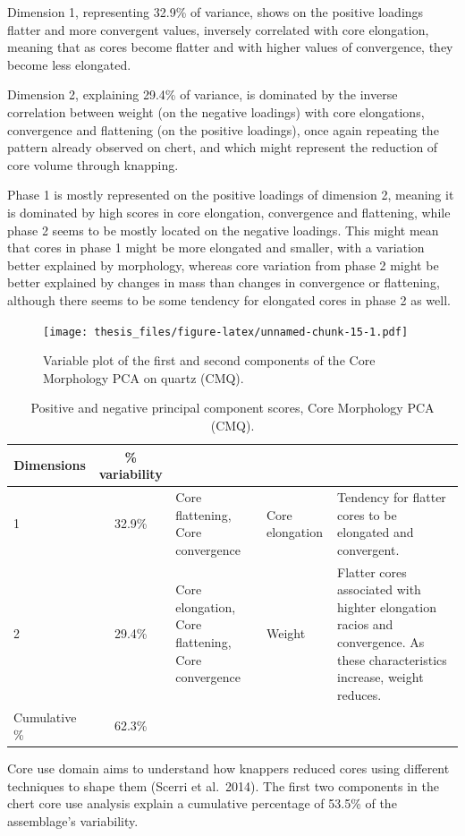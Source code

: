 \documentclass[12pt,twoside]{reedthesis}
\begin{document}
Dimension 1, representing 32.9\% of variance, shows on the positive loadings flatter and more convergent values, inversely correlated with core elongation, meaning that as cores become flatter and with higher values of convergence, they become less elongated.

Dimension 2, explaining 29.4\% of variance, is dominated by the inverse correlation between weight (on the negative loadings) with core elongations, convergence and flattening (on the positive loadings), once again repeating the pattern already observed on chert, and which might represent the reduction of core volume through knapping.

Phase 1 is mostly represented on the positive loadings of dimension 2, meaning it is dominated by high scores in core elongation, convergence and flattening, while phase 2 seems to be mostly located on the negative loadings. This might mean that cores in phase 1 might be more elongated and smaller, with a variation better explained by morphology, whereas core variation from phase 2 might be better explained by changes in mass than changes in convergence or flattening, although there seems to be some tendency for elongated cores in phase 2 as well.
\begin{figure}
\centering
\texttt{[image: thesis\_files/figure-latex/unnamed-chunk-15-1.pdf]}
\caption{\label{fig:unnamed-chunk-15}Variable plot of the first and second components of the Core Morphology PCA on quartz (CMQ).}
\end{figure}
\begin{table}[!h]

\caption{\label{tab:unnamed-chunk-16}Positive and negative principal component scores, Core Morphology PCA (CMQ).}
\centering
\begin{tabular}[t]{lc>{\raggedright\arraybackslash}p{3cm}>{\raggedright\arraybackslash}p{3cm}>{\raggedright\arraybackslash}p{3cm}}
\toprule
\multicolumn{1}{c}{\textbf{Dimensions}} & \multicolumn{1}{c}{\textbf{\% variability}} & \multicolumn{1}{>{\centering\arraybackslash}p{3cm}}{\textbf{+}} & \multicolumn{1}{>{\centering\arraybackslash}p{3cm}}{\textbf{-}} & \multicolumn{1}{>{\centering\arraybackslash}p{3cm}}{\textbf{Interpretation}}\\
\midrule
1 & 32.9\% & Core flattening, Core convergence & Core elongation & Tendency for flatter cores to be elongated and convergent.\\
2 & 29.4\% & Core elongation, Core flattening, Core convergence & Weight & Flatter cores associated with highter elongation racios and convergence. As these characteristics increase, weight reduces.\\
Cumulative \% & 62.3\% &  &  & \\
\bottomrule
\end{tabular}
\end{table}
Core use domain aims to understand how knappers reduced cores using different techniques to shape them (Scerri et al.~2014). The first two components in the chert core use analysis explain a cumulative percentage of 53.5\% of the assemblage's variability.
\end{document}
